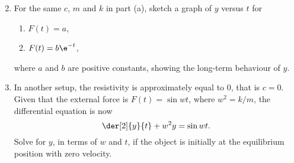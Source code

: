 \begin{problem}
    \begin{enumerate}
        \setcounter{enumi}{1}
        \item For the same $c$, $m$ and $k$ in part (a), sketch a graph of $y$ versus $t$ for
        \begin{enumerate}
            \item $F(t) = a$,
            \item $F(t) = b\e^{-t}$,
        \end{enumerate}
        where $a$ and $b$ are positive constants, showing the long-term behaviour of $y$.
        \item In another setup, the resistivity is approximately equal to 0, that is $c = 0$. Given that the external force is $F(t) = \sin wt$, where $w^2 = k/m$, the differential equation is now \[\der[2]{y}{t} + w^2 y = \sin wt.\] Solve for $y$, in terms of $w$ and $t$, if the object is initially at the equilibrium position with zero velocity.
    \end{enumerate}
\end{problem}
